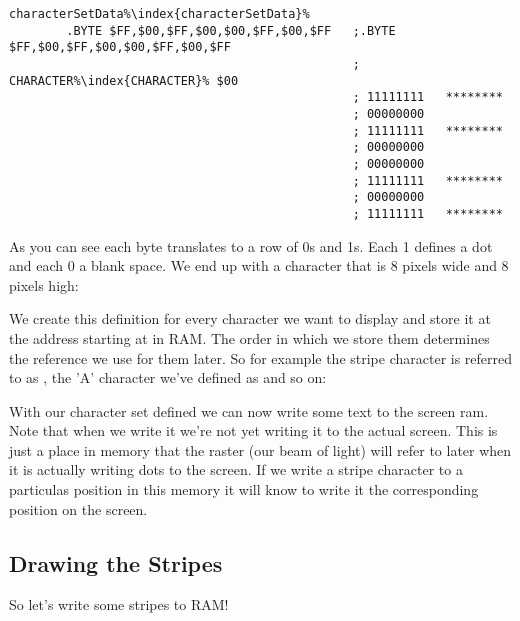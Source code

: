 \begin{lstlisting}[caption= The 'stripe' character\index{character}.,basicstyle=\tiny,escapechar=\%]
characterSetData%\index{characterSetData}%
        .BYTE $FF,$00,$FF,$00,$00,$FF,$00,$FF   ;.BYTE $FF,$00,$FF,$00,$00,$FF,$00,$FF
                                                ; CHARACTER%\index{CHARACTER}% $00
                                                ; 11111111   ********
                                                ; 00000000           
                                                ; 11111111   ********
                                                ; 00000000           
                                                ; 00000000           
                                                ; 11111111   ********
                                                ; 00000000           
                                                ; 11111111   ********
\end{lstlisting}

As you can see each byte translates to a row of 0s and 1s. Each 1 defines a dot and each 0 a blank space. We end up
with a character that is 8 pixels wide and 8 pixels high:



We create this definition for every character we want to display and store it at the address starting at 
in RAM. The order in which we store them determines the reference we use for them later. So for example the stripe
character is referred to as , the 'A' character we've defined as  and so on:



With our character set defined we can now write some text to the screen ram. Note that when we write it 
we're not yet writing it to the actual screen. This is just a place in memory that the raster (our beam of light)
will refer to later when it is actually writing dots to the screen. If we write a stripe character to a particulas position
in this  memory it will know to write it the corresponding position on the screen.

\subsection{Drawing the Stripes}
So let's write some stripes to RAM!

